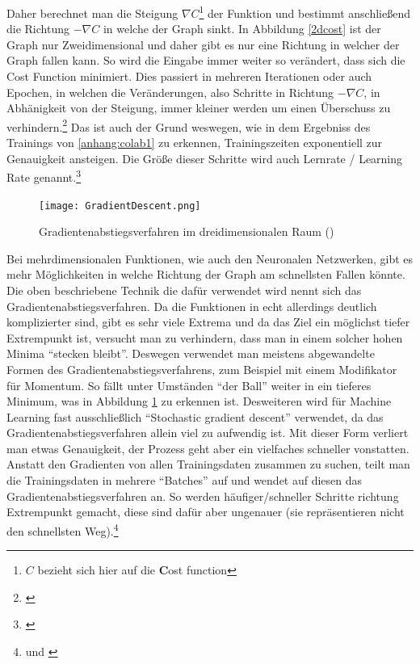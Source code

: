Daher berechnet man die Steigung $\nabla C$\footnote{$C$ bezieht sich hier auf die \textbf{C}ost function} der Funktion und bestimmt anschließend die Richtung $-\nabla C$ in welche der Graph sinkt. In Abbildung \ref{2dcost} ist der Graph nur Zweidimensional und daher gibt es nur eine Richtung in welcher der Graph fallen kann. So wird die Eingabe immer weiter so verändert, dass sich die Cost Function minimiert. Dies passiert in mehreren Iterationen oder auch Epochen, in welchen die Veränderungen, also Schritte in Richtung $-\nabla C$, in Abhänigkeit von der Steigung, immer kleiner werden um einen Überschuss zu verhindern.\footnote{\cite{3blue1brown}} Das ist auch der Grund weswegen, wie in dem Ergebniss des Trainings von \ref{anhang:colab1} zu erkennen, Trainingszeiten exponentiell zur Genauigkeit ansteigen. Die Größe dieser Schritte wird auch Lernrate / Learning Rate genannt.\footnote{\cite{readthedocsgradientdescent}}

\setlength{\belowcaptionskip}{-40pt}
\begin{figure}
    \texttt{[image: GradientDescent.png]}
    \caption[3dcost]{Gradientenabstiegsverfahren im dreidimensionalen Raum (\cite{3blue1brown})}
    \label{3dcost}
\end{figure}
\setlength{\belowcaptionskip}{0pt}

Bei mehrdimensionalen Funktionen, wie auch den Neuronalen Netzwerken, gibt es mehr Möglichkeiten in welche Richtung der Graph am schnellsten Fallen könnte. Die oben beschriebene Technik die dafür verwendet wird nennt sich das Gradientenabstiegsverfahren. Da die Funktionen in echt allerdings deutlich komplizierter sind, gibt es sehr viele Extrema und da das Ziel ein möglichst tiefer Extrempunkt ist, versucht man zu verhindern, dass man in einem solcher hohen Minima "`stecken bleibt"'. Deswegen verwendet man meistens abgewandelte Formen des Gradientenabstiegsverfahrens, zum Beispiel mit einem Modifikator für Momentum. So fällt unter Umständen "`der Ball"' weiter in ein tieferes Minimum, was in Abbildung \ref{3dcost} zu erkennen ist. Desweiteren wird für Machine Learning fast ausschließlich "`Stochastic gradient descent"' verwendet, da das Gradientenabstiegsverfahren allein viel zu aufwendig ist. Mit dieser Form verliert man etwas Genauigkeit, der Prozess geht aber ein vielfaches schneller vonstatten. Anstatt den Gradienten von allen Trainingsdaten zusammen zu suchen, teilt man die Trainingsdaten in mehrere "`Batches"' auf und wendet auf diesen das Gradientenabstiegsverfahren an. So werden häufiger/schneller Schritte richtung Extrempunkt gemacht, diese sind dafür aber ungenauer (sie repräsentieren nicht den schnellsten Weg).\footnote{\cite{3blue1brown} und \cite{mitstochasticgd}}

